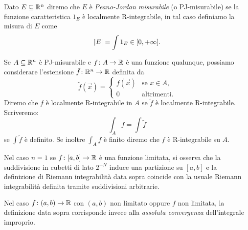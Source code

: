 \begin{definition}
Dato $E\subseteq {\mathbb R}^n$ diremo che $E$ è \emph{Peano-Jordan misurabile} 
(o PJ-misurabile) se la funzione caratteristica $1_E$ è localmente 
R-integrabile, in tal caso definiamo la misura di $E$ come 
\[
{\left|E\right|} = \int 1_E \in [0,+\infty].
\] 

Se $A\subseteq {\mathbb R}^n$ è PJ-misurabile e $f\colon A \to {\mathbb R}$
è una funzione qualunque, possiamo considerare l'estensione 
$\tilde f\colon {\mathbb R}^n \to {\mathbb R}$ definita da 
\[
 \tilde f(\vec x) = \begin{cases}
    f(\vec x) & \text{se $x\in A$,}\\
    0 & \text{altrimenti.}
 \end{cases}
\]
Diremo che $f$ è localmente R-integrabile in $A$ se $\tilde f$ 
è localmente R-integrabile. 
Scriveremo:
\[
 \int_A f = \int \tilde f
\]
se $\int \tilde f$ è definito.
Se inoltre $\int_A f$ è finito diremo che $f$ è R-integrabile
su $A$.
\end{definition}

\begin{remark}[caso $n=1$]
Nel caso $n=1$ se $f\colon [a,b]\to {\mathbb R}$ è una funzione limitata,
si osserva che la suddivisione in cubetti di lato $2^{-N}$ induce una partizione 
su $[a,b]$ e la definizione di Riemann integrabilità data sopra coincide con la 
usuale Riemann integrabilità definita tramite suddivisioni arbitrarie.

Nel caso $f\colon(a,b)\to {\mathbb R}$ con $(a,b)$ non limitato oppure $f$ non limitata,
la definizione data sopra corrisponde invece alla \emph{assoluta convergenza} 
dell'integrale improprio.
\end{remark}

